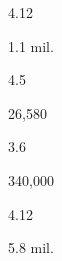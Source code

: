 \begin{description}[font=\normalfont,style=nextline]
\begin{multicols}{2}
\begin{description}[font=\normalfont\itshape,noitemsep]
 \item[] 
 \item[\pbnumberabbr] 4.12 
 \item[\family] \famUralic 
 \item[]
\item[\nativespeakers] 1.1 mil. 
 \item[\region] \regionEstonia 
 \end{description}\end{multicols}
\item[\langnameEvenki] 
 \begin{multicols}{2}\begin{description}[font=\normalfont\itshape,noitemsep] 
 \item[] 
 \item[\pbnumberabbr] 4.5 
 \item[\family] \famTungusic 
 \item[]
\item[\nativespeakers] 26,580 
 \item[\region] \regionChina\EnumComma\regionRussia 
 \end{description}\end{multicols}
\item[\langnameFijian] 
 \begin{multicols}{2}\begin{description}[font=\normalfont\itshape,noitemsep] 
 \item[] 
 \item[\pbnumberabbr] 3.6 
 \item[\family] \famAustronesian 
 \item[]
\item[\nativespeakers] 340,000 
 \item[\region] \regionFiji 
 \end{description}\end{multicols}
\item[\langnameFinnish] 
 \begin{multicols}{2}\begin{description}[font=\normalfont\itshape,noitemsep] 
 \item[] 
 \item[\pbnumberabbr] 4.12 
 \item[\family] \famUralic 
 \item[]
\item[\nativespeakers] 5.8 mil. 
 \item[\region] \regionFinland 
 \end{description}\end{multicols}

\end{description}
